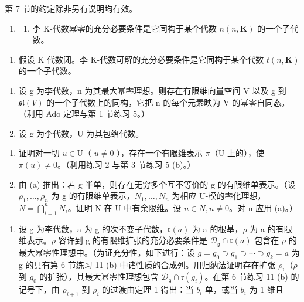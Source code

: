 
第 7 节的约定除非另有说明均有效。

\begin{enumerate}
\def\labelenumi{\arabic{enumi}.}
\tightlist
\item
  \begin{enumerate}
  \def\labelenumii{(\alph{enumii})}
  \tightlist
  \item
    李 K-代数幂零的充分必要条件是它同构于某个代数 \(n(n, \mathbf{K})\) 的一个子代数。
  \end{enumerate}
\end{enumerate}

\begin{enumerate}
\def\labelenumi{(\alph{enumi})}
\setcounter{enumi}{1}
\tightlist
\item
  假设 K 代数闭。李 K-代数可解的充分必要条件是它同构于某个代数 \(t(n, \mathbf{K})\) 的一个子代数。
\end{enumerate}

\begin{enumerate}
\def\labelenumi{\arabic{enumi}.}
\setcounter{enumi}{1}
\item
  设 g 为李代数，n 为其最大幂零理想。则存在有限维向量空间 V 以及 g 到 \(\mathfrak{sl}(V)\) 的一个子代数上的同构，它把 n 的每个元素映为 V 的幂零自同态。（利用 Ado 定理与第 1 节练习 5。）
\item
  设 g 为李代数，U 为其包络代数。
\end{enumerate}

\begin{enumerate}
\def\labelenumi{(\alph{enumi})}
\item
  证明对一切 \(u \in \mathrm{U}\)（ \(u \neq 0\) ），存在一个有限维表示 \(\pi\)（\(\mathrm{U}\) 上的），使 \(\pi(u) \neq 0\)。（利用练习 2 与第 3 节练习 5 (b)。）
\item
  由 (a) 推出：若 g 半单，则存在无穷多个互不等价的 g 的有限维单表示。（设 \(\rho_{1},\ldots,\rho_{n}\) 为 g 的有限维单表示，\(N_{1},\ldots,N_{n}\) 为相应 U-模的零化理想，\(N=\bigcap_{i=1}^{n}N_{i}\)。证明 N 在 U 中有余限维。设 \(n\in N,n\neq0\)。对 n 应用 (a)。）
\end{enumerate}

\begin{enumerate}
\def\labelenumi{\arabic{enumi}.}
\setcounter{enumi}{3}
\tightlist
\item
  设 g 为李代数，a 为 g 的次不变子代数，\(\mathfrak{r}(a)\) 为 a 的根基，\(\rho\) 为 a 的有限维表示。\(\rho\) 容许到 g 的有限维扩张的充分必要条件是 \(\mathcal{D}_{\mathfrak{g}} \cap \mathfrak{r}(a)\) 包含在 \(\rho\) 的最大幂零性理想中。（为证充分性，如下进行：设 \(g = g_{0} \supset g_{1} \supset \cdots \supset g_{k} = a\) 为 g 的具有第 6 节练习 11 (b) 中诸性质的合成列。用归纳法证明存在扩张 \(\rho_{i}\)（\(\rho\) 到 \(g_{0}\) 的扩张），其最大幂零性理想包含 \(\mathcal{D}_{\mathfrak{g}} \cap \mathfrak{r}(g_{i})\)。在第 6 节练习 11 (b) 的记号下，由 \(\rho_{i+1}\) 到 \(\rho_{i}\) 的过渡由定理 1 得出：当 \(b_{i}\) 单，或当 \(b_{i}\) 为 1 维且
\end{enumerate}

